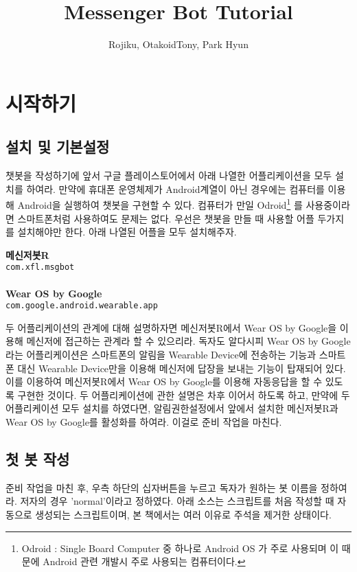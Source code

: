 \documentclass[10pt,b6paper,final]{book}
\author{Rojiku, OtakoidTony, Park Hyun}
\title{Messenger Bot Tutorial}
\begin{document}
\maketitle
\tableofcontents
\chapter{시작하기}
\section{설치 및 기본설정}
챗봇을 작성하기에 앞서 구글 플레이스토어에서 아래 나열한 어플리케이션을 모두 설치를 하여라.
만약에 휴대폰 운영체제가 Android계열이 아닌 경우에는 컴퓨터를 이용해 Android을 실행하여 
챗봇을 구현할 수 있다. 컴퓨터가 만일 Odroid\footnote{Odroid : Single Board Computer 중 하나로 Android OS 가 주로 사용되며 이 때문에 Android 관련 개발시 주로 사용되는 컴퓨터이다.} 를 사용중이라면 스마트폰처럼 사용하여도 문제는
없다. 우선은 챗봇을 만들 때 사용할 어플 두가지를 설치해야만 한다. 아래 나열된 어플을 모두 설치해주자.
\begin{tcolorbox}
\textbf{메신저봇R}\\
\texttt{com.xfl.msgbot}\\\\
\textbf{Wear OS by Google}\\
\texttt{com.google.android.wearable.app}
\end{tcolorbox}
두 어플리케이션의 관계에 대해 설명하자면 메신저봇R에서 
Wear OS by Google을 이용해 메신저에 접근하는 관계라 할 수 있으리라.
독자도 알다시피 Wear OS by Google라는 어플리케이션은 스마트폰의 알림을
Wearable Device에 전송하는 기능과 스마트폰 대신 Wearable Device만을
이용해 메신저에 답장을 보내는 기능이 탑재되어 있다.
이를 이용하여 메신저봇R에서 Wear OS by Google를 이용해 자동응답을
할 수 있도록 구현한 것이다. 두 어플리케이션에 관한 설명은 차후 이어서 하도록 하고,
만약에 두 어플리케이션 모두 설치를 하였다면, 알림권한설정에서 앞에서 설치한 메신저봇R과 Wear OS by Google를 활성화를 하여라. 이걸로 준비 작업을 마친다.

\section{첫 봇 작성}
준비 작업을 마친 후, 우측 하단의 십자버튼을 누르고 독자가 원하는 봇 이름을 정하여라.
저자의 경우 'normal'이라고 정하였다.
아래 소스는 스크립트를 처음 작성할 때 자동으로 생성되는 스크립트이며,
본 책에서는 여러 이유로 주석을 제거한 상태이다.
\end{document}

